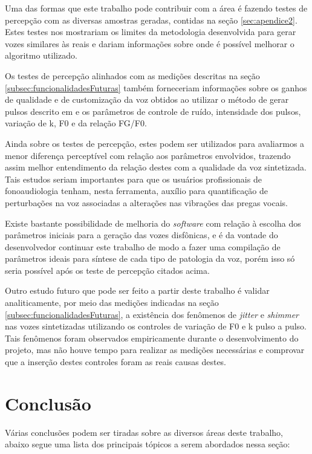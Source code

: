 \documentclass[
  12pt,       
  openright,      
  twoside,      
  a4paper,      
  english,      
  french,       
  spanish,      
  brazil,     
  ]{abntex2}
\begin{document}
Uma das formas que este trabalho pode contribuir com a área é fazendo testes de percepção com as diversas amostras geradas, contidas na seção \ref{sec:apendice2}. Estes testes nos mostrariam os limites da metodologia desenvolvida para gerar vozes similares às reais e dariam informações sobre onde é possível melhorar o algoritmo utilizado.

Os testes de percepção alinhados com as medições descritas na seção \ref{subsec:funcionalidadesFuturas} também forneceriam informações sobre os ganhos de qualidade e de customização da voz obtidos ao utilizar o método de gerar pulsos descrito em  e os parâmetros de controle de ruído, intensidade dos pulsos, variação de k, F0 e da relação FG/F0.

Ainda sobre os testes de percepção, estes podem ser utilizados para avaliarmos a menor diferença perceptível com relação aos parâmetros envolvidos, trazendo assim melhor entendimento da relação destes com a qualidade da voz sintetizada. Tais estudos seriam importantes para que os usuários profissionais de fonoaudiologia tenham, nesta ferramenta, auxílio para quantificação de perturbações na voz associadas a alterações nas vibrações das pregas vocais.

Existe bastante possibilidade de melhoria do \textit{software} com relação à escolha dos parâmetros iniciais para a geração das vozes disfônicas, e é da vontade do desenvolvedor continuar este trabalho de modo a fazer uma compilação de parâmetros ideais para síntese de cada tipo de patologia da voz, porém isso só seria possível após os teste de percepção citados acima.

Outro estudo futuro que pode ser feito a partir deste trabalho é validar analiticamente, por meio das medições indicadas na seção \ref{subsec:funcionalidadesFuturas}, a existência dos fenômenos de \textit{jitter} e \textit{shimmer} nas vozes sintetizadas utilizando os controles de variação de F0 e k pulso a pulso. Tais fenômenos foram observados empiricamente durante o desenvolvimento do projeto, mas não houve tempo para realizar as medições necessárias e comprovar que a inserção destes controles foram as reais causas destes.

\chapter{Conclusão}
Várias conclusões podem ser tiradas sobre as diversos áreas deste trabalho, abaixo segue uma lista dos principais tópicos a serem abordados nessa seção:
\end{document}
